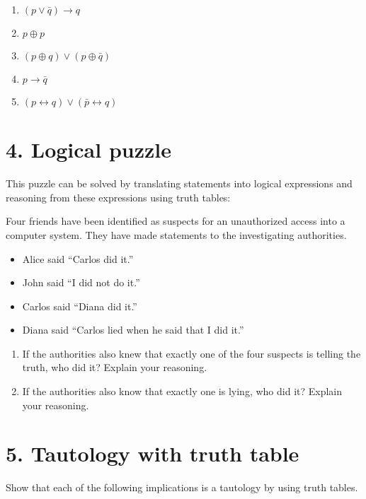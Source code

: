 \documentclass[a4paper,10pt]{article}
\begin{document}
\begin{enumerate}
  \item $(p \lor \bar{q}) \to q$
  \item $p \oplus p$
  \item $(p \oplus q) \lor (p \oplus \bar{q})$
  \item $p \to \bar{q}$
  \item $(p \leftrightarrow q) \lor (\bar{p} \leftrightarrow q)$
\end{enumerate}

\newpage
\mbox{} 

\newpage
\mbox{}

\section*{4. Logical puzzle}
This puzzle can be solved by translating statements into logical expressions and reasoning from these expressions using truth tables:

Four friends have been identified as suspects for an unauthorized access into a computer system. They have made statements to the investigating authorities.

\begin{itemize}
  \item Alice said ``Carlos did it.''
  \item John said ``I did not do it.''
  \item Carlos said ``Diana did it.''
  \item Diana said ``Carlos lied when he said that I did it.''
\end{itemize}

\begin{enumerate}
  \item If the authorities also knew that exactly one of the four suspects is telling the truth, who did it? Explain your reasoning.
  \item If the authorities also know that exactly one is lying, who did it? Explain your reasoning.
\end{enumerate}


\newpage
\mbox{} 

\newpage
\mbox{}

\section*{5. Tautology with truth table}
Show that each of the following implications is a tautology by using truth tables.
\end{document}
